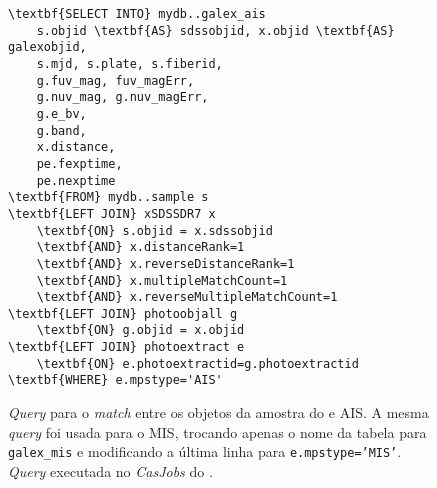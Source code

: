 \begin{figure}
\begin{Verbatim}[frame=single,commandchars=\\\{\}]
\textbf{SELECT INTO} mydb..galex_ais
	s.objid \textbf{AS} sdssobjid, x.objid \textbf{AS} galexobjid,
	s.mjd, s.plate, s.fiberid,
	g.fuv_mag, fuv_magErr,
	g.nuv_mag, g.nuv_magErr,
	g.e_bv,
	g.band,
	x.distance,
	pe.fexptime,
	pe.nexptime
\textbf{FROM} mydb..sample s
\textbf{LEFT JOIN} xSDSSDR7 x
	\textbf{ON} s.objid = x.sdssobjid
	\textbf{AND} x.distanceRank=1
	\textbf{AND} x.reverseDistanceRank=1
	\textbf{AND} x.multipleMatchCount=1
	\textbf{AND} x.reverseMultipleMatchCount=1
\textbf{LEFT JOIN} photoobjall g
	\textbf{ON} g.objid = x.objid
\textbf{LEFT JOIN} photoextract e
	\textbf{ON} e.photoextractid=g.photoextractid
\textbf{WHERE} e.mpstype='AIS'
\end{Verbatim}
	\caption[{\em Match} entre os objetos da amostra do \starlight e \galex.]
	{{\em Query} para o {\em match} entre os objetos da amostra do \starlight e
	\galex AIS. A mesma {\em query} foi usada para o MIS, trocando apenas o nome da
	tabela para \texttt{galex\_mis} e modificando a última linha para
	\texttt{e.mpstype='MIS'}. {\em Query} executada no {\em CasJobs} do \galex.}
	\label{fig:QueryMatchAIS}
\end{figure}


